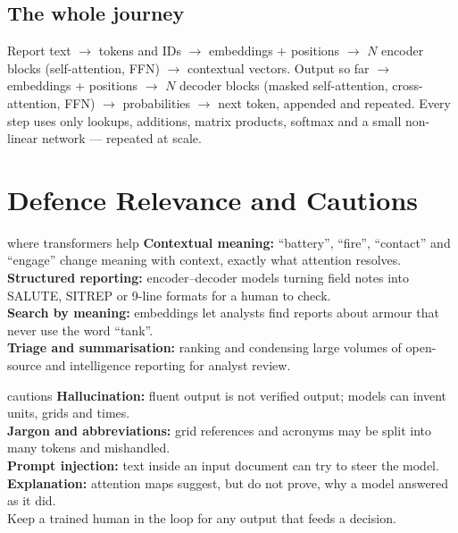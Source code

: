\documentclass[11pt]{article}
\begin{document}
\subsection{The whole journey}
Report text $\to$ tokens and IDs $\to$ embeddings + positions $\to$ $N$ encoder blocks (self-attention, FFN) $\to$ contextual vectors. Output so far $\to$ embeddings + positions $\to$ $N$ decoder blocks (masked self-attention, cross-attention, FFN) $\to$ probabilities $\to$ next token, appended and repeated. Every step uses only lookups, additions, matrix products, softmax and a small non-linear network --- repeated at scale.

\section{Defence Relevance and Cautions}
\begin{defence}{where transformers help}
\textbf{Contextual meaning:} ``battery'', ``fire'', ``contact'' and ``engage'' change meaning with context, exactly what attention resolves.\\
\textbf{Structured reporting:} encoder--decoder models turning field notes into SALUTE, SITREP or 9-line formats for a human to check.\\
\textbf{Search by meaning:} embeddings let analysts find reports about armour that never use the word ``tank''.\\
\textbf{Triage and summarisation:} ranking and condensing large volumes of open-source and intelligence reporting for analyst review.
\end{defence}
\begin{pitfall}{cautions}
\textbf{Hallucination:} fluent output is not verified output; models can invent units, grids and times.\\
\textbf{Jargon and abbreviations:} grid references and acronyms may be split into many tokens and mishandled.\\
\textbf{Prompt injection:} text inside an input document can try to steer the model.\\
\textbf{Explanation:} attention maps suggest, but do not prove, why a model answered as it did.\\
Keep a trained human in the loop for any output that feeds a decision.
\end{pitfall}
\end{document}
